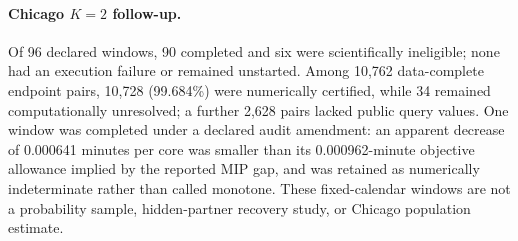 \paragraph{Chicago $K=2$ follow-up.}
Of 96 declared windows, 90 completed and six were scientifically ineligible;
none had an execution failure or remained unstarted. Among 10,762 data-complete
endpoint pairs, 10,728 (99.684\%) were numerically certified, while 34 remained
computationally unresolved; a further 2,628 pairs lacked public query values.
One window was completed under a declared audit amendment: an apparent decrease
of 0.000641 minutes per core was smaller than its 0.000962-minute objective
allowance implied by the reported MIP gap, and was retained as numerically
indeterminate rather than called monotone. These fixed-calendar windows are not
a probability sample, hidden-partner recovery study, or Chicago population
estimate.
